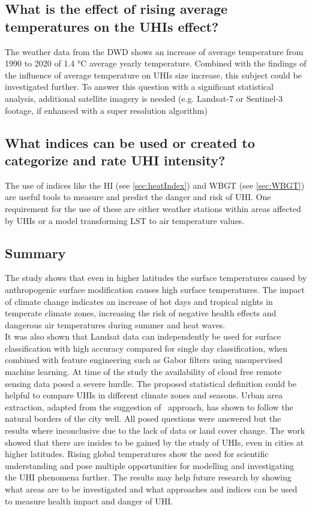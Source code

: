 \documentclass[12pt,a4paper, english,twoside]{scrartcl}
\begin{document}
  \subsection{What is the effect of rising average temperatures on the \glspl{UHI} effect?}\label{a4}
   The weather data from the \gls{DWD} shows an increase of average temperature from 1990 to 2020 of 1.4 °C average yearly temperature. 
   Combined with the findings of the influence of average temperature on \glspl{UHI} size increase, this subject could be investigated further.
   To answer this question with a significant statistical analysis, additional satellite imagery is needed (e.g. Landsat-7 or Sentinel-3 footage, if enhanced with a super resolution algorithm)
   
 \subsection{What indices can be used or created to categorize and rate \gls{UHI} intensity?}\label{a5}
   The use of indices like the \gls{HI} (see \cref{sec:heatIndex}) and \gls{WBGT} (see \cref{sec:WBGT}) are useful tools to measure and predict the danger and risk of \gls{UHI}.
   One requirement for the use of these are either weather stations within areas affected by \glspl{UHI} or a model transforming LST to air temperature values. 

\subsection{Summary}
    The study shows that even in higher latitudes the surface temperatures caused by anthropogenic surface modification causes high surface temperatures. 
    The impact of climate change indicates an increase of hot days and tropical nights in temperate climate zones, increasing the risk of negative health effects and dangerous air temperatures during summer and heat waves.\\%
    It was also shown that Landsat data can independently be used for surface classification with high accuracy compared for single day classification, when combined with feature engineering such as Gabor filters using unsupervised machine learning.
    At time of the study the availability of cloud free remote sensing data posed a severe hurdle. 
    The proposed statistical definition could be helpful to compare \glspl{UHI} in different climate zones and seasons. 
    Urban area extraction, adapted from the suggestion of~\cite{Sobrino2020} approach, has shown to follow the natural borders of the city well.
    All posed questions were answered but the results where inconclusive due to the lack of data or land cover change.
    The work showed that there are insides to be gained by the study of \glspl{UHI}, even in cities at higher latitudes. 
    Rising global temperatures show the need for scientific understanding and pose multiple opportunities for modelling and investigating the \gls{UHI} phenomena further.
    The results may help future research by showing what areas are to be investigated and what approaches and indices can be used to measure health impact and danger of \gls{UHI}.
\end{document}
